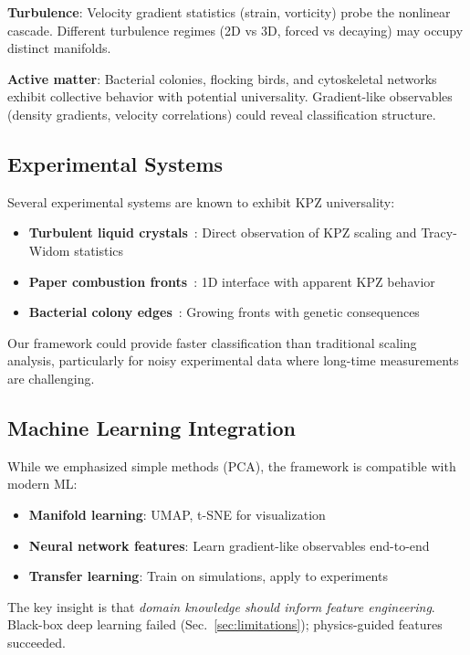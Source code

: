 \documentclass[aps,pre,twocolumn,superscriptaddress,showpacs,longbibliography]{revtex4-2}
\begin{document}
\textbf{Turbulence}: Velocity gradient statistics (strain, vorticity) probe the nonlinear cascade. Different turbulence regimes (2D vs 3D, forced vs decaying) may occupy distinct manifolds.

\textbf{Active matter}: Bacterial colonies, flocking birds, and cytoskeletal networks exhibit collective behavior with potential universality. Gradient-like observables (density gradients, velocity correlations) could reveal classification structure.

\subsection{Experimental Systems}

Several experimental systems are known to exhibit KPZ universality:

\begin{itemize}
\item \textbf{Turbulent liquid crystals}~\cite{Takeuchi2010}: Direct observation of KPZ scaling and Tracy-Widom statistics
\item \textbf{Paper combustion fronts}~\cite{Myllys2001}: 1D interface with apparent KPZ behavior
\item \textbf{Bacterial colony edges}~\cite{Hallatschek2007}: Growing fronts with genetic consequences
\end{itemize}

Our framework could provide faster classification than traditional scaling analysis, particularly for noisy experimental data where long-time measurements are challenging.

\subsection{Machine Learning Integration}

While we emphasized simple methods (PCA), the framework is compatible with modern ML:

\begin{itemize}
\item \textbf{Manifold learning}: UMAP, t-SNE for visualization
\item \textbf{Neural network features}: Learn gradient-like observables end-to-end
\item \textbf{Transfer learning}: Train on simulations, apply to experiments
\end{itemize}

The key insight is that \emph{domain knowledge should inform feature engineering}. Black-box deep learning failed (Sec.~\ref{sec:limitations}); physics-guided features succeeded.
\end{document}
